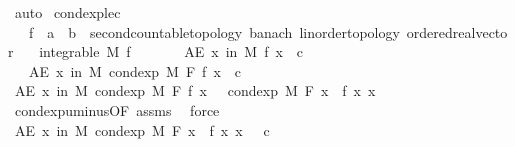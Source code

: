 \begin{isabellebody}
\ auto\isanewline
{}\isamarkupfalse%
%
\endisatagproof
{\isafoldproof}%
%
\isadelimproof
\isanewline
%
\endisadelimproof
\isanewline
{}\isamarkupfalse%
\ cond{\isacharunderscore}{\kern0pt}exp{\isacharunderscore}{\kern0pt}le{\isacharunderscore}{\kern0pt}c{\isacharcolon}{\kern0pt}\isanewline
\ \ \ f\ {\isacharcolon}{\kern0pt}{\isacharcolon}{\kern0pt}\ {\isachardoublequoteopen}{\isacharprime}{\kern0pt}a\ {\isasymRightarrow}\ {\isacharprime}{\kern0pt}b\ {\isacharcolon}{\kern0pt}{\isacharcolon}{\kern0pt}\ {\isacharbraceleft}{\kern0pt}second{\isacharunderscore}{\kern0pt}countable{\isacharunderscore}{\kern0pt}topology{\isacharcomma}{\kern0pt}\ banach{\isacharcomma}{\kern0pt}\ linorder{\isacharunderscore}{\kern0pt}topology{\isacharcomma}{\kern0pt}\ ordered{\isacharunderscore}{\kern0pt}real{\isacharunderscore}{\kern0pt}vector{\isacharbraceright}{\kern0pt}{\isachardoublequoteclose}\isanewline
\ \ \ {\isachardoublequoteopen}integrable\ M\ f{\isachardoublequoteclose}\isanewline
\ \ \ \ \ \ \ {\isachardoublequoteopen}AE\ x\ in\ M{\isachardot}{\kern0pt}\ f\ x\ {\isasymle}\ c{\isachardoublequoteclose}\isanewline
\ \ \ {\isachardoublequoteopen}AE\ x\ in\ M{\isachardot}{\kern0pt}\ cond{\isacharunderscore}{\kern0pt}exp\ M\ F\ f\ x\ {\isasymle}\ c{\isachardoublequoteclose}\isanewline
%
\isadelimproof
%
\endisadelimproof
%
\isatagproof
{}\isamarkupfalse%
\ {\isacharminus}{\kern0pt}\isanewline
\ \ \isamarkupfalse%
\ {\isachardoublequoteopen}AE\ x\ in\ M{\isachardot}{\kern0pt}\ cond{\isacharunderscore}{\kern0pt}exp\ M\ F\ f\ x\ {\isacharequal}{\kern0pt}\ {\isacharminus}{\kern0pt}\ cond{\isacharunderscore}{\kern0pt}exp\ M\ F\ {\isacharparenleft}{\kern0pt}{\isasymlambda}x{\isachardot}{\kern0pt}\ {\isacharminus}{\kern0pt}\ f\ x{\isacharparenright}{\kern0pt}\ x{\isachardoublequoteclose}\ \isamarkupfalse%
\ cond{\isacharunderscore}{\kern0pt}exp{\isacharunderscore}{\kern0pt}uminus{\isacharbrackleft}{\kern0pt}OF\ assms{\isacharparenleft}{\kern0pt}{}{\isacharparenright}{\kern0pt}{\isacharbrackright}{\kern0pt}\ \isamarkupfalse%
\ force\isanewline
\ \ \isamarkupfalse%
\ \isamarkupfalse%
\ {\isachardoublequoteopen}AE\ x\ in\ M{\isachardot}{\kern0pt}\ cond{\isacharunderscore}{\kern0pt}exp\ M\ F\ {\isacharparenleft}{\kern0pt}{\isasymlambda}x{\isachardot}{\kern0pt}\ {\isacharminus}{\kern0pt}\ f\ x{\isacharparenright}{\kern0pt}\ x\ {\isasymge}\ {\isacharminus}{\kern0pt}\ c{\isachardoublequoteclose}\ \isamarkupfalse%

\end{isabellebody}
